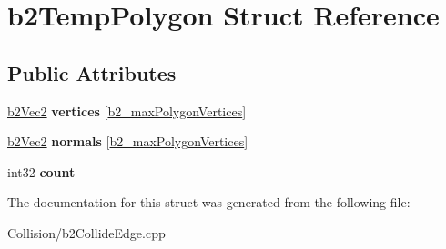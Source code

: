 \hypertarget{structb2TempPolygon}{}\section{b2\+Temp\+Polygon Struct Reference}
\label{structb2TempPolygon}
\subsection*{Public Attributes}
\begin{DoxyCompactItemize}
\item 
\mbox{\label{structb2TempPolygon_a7351a98f6052d1fce66e11bfc5b98a3a}} 
\mbox{\hyperlink{structb2Vec2}{b2\+Vec2}} {\bfseries vertices} \mbox{[}\mbox{\hyperlink{b2Settings_8h_a09d71ee1993bee28b5b2e6d893b41884}{b2\+\_\+max\+Polygon\+Vertices}}\mbox{]}
\item 
\mbox{\label{structb2TempPolygon_a45b9db5dcbcb66170029e9a2f524fc6a}} 
\mbox{\hyperlink{structb2Vec2}{b2\+Vec2}} {\bfseries normals} \mbox{[}\mbox{\hyperlink{b2Settings_8h_a09d71ee1993bee28b5b2e6d893b41884}{b2\+\_\+max\+Polygon\+Vertices}}\mbox{]}
\item 
\mbox{\label{structb2TempPolygon_a5b08379f676f8498190c398d9ec3d0a5}} 
int32 {\bfseries count}
\end{DoxyCompactItemize}


The documentation for this struct was generated from the following file\+:\begin{DoxyCompactItemize}
\item 
Collision/b2\+Collide\+Edge.\+cpp\end{DoxyCompactItemize}
